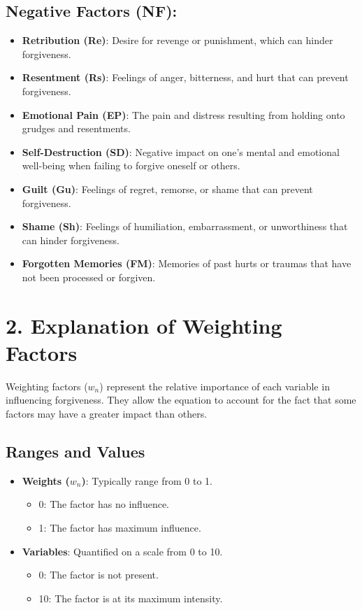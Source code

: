 \documentclass{article}
\begin{document}
\subsection*{Negative Factors (NF):}

\begin{itemize}
    \item \textbf{Retribution (Re)}: Desire for revenge or punishment, which can hinder forgiveness.
    \item \textbf{Resentment (Rs)}: Feelings of anger, bitterness, and hurt that can prevent forgiveness.
    \item \textbf{Emotional Pain (EP)}: The pain and distress resulting from holding onto grudges and resentments.
    \item \textbf{Self-Destruction (SD)}: Negative impact on one's mental and emotional well-being when failing to forgive oneself or others.
    \item \textbf{Guilt (Gu)}: Feelings of regret, remorse, or shame that can prevent forgiveness.
    \item \textbf{Shame (Sh)}: Feelings of humiliation, embarrassment, or unworthiness that can hinder forgiveness.
    \item \textbf{Forgotten Memories (FM)}: Memories of past hurts or traumas that have not been processed or forgiven.
\end{itemize}

\section*{2. Explanation of Weighting Factors}

Weighting factors ($w_n$) represent the relative importance of each variable in influencing forgiveness. They allow the equation to account for the fact that some factors may have a greater impact than others.

\subsection*{Ranges and Values}

\begin{itemize}
    \item \textbf{Weights ($w_n$)}: Typically range from 0 to 1.
    \begin{itemize}
        \item 0: The factor has no influence.
        \item 1: The factor has maximum influence.
    \end{itemize}
    \item \textbf{Variables}: Quantified on a scale from 0 to 10.
    \begin{itemize}
        \item 0: The factor is not present.
        \item 10: The factor is at its maximum intensity.
    \end{itemize}
\end{itemize}
\end{document}
